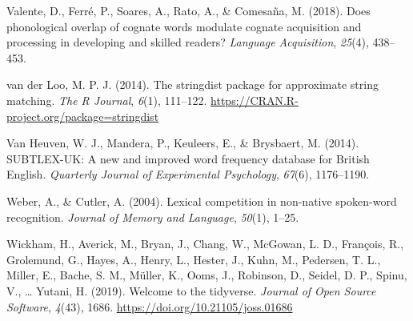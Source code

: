 \documentclass[
]{article}
\newlength{\cslhangindent}
\newenvironment{CSLReferences}[2] %
 {\begin{list}{}{%
  \setlength{\itemindent}{0pt}
  \setlength{\leftmargin}{0pt}
  \setlength{\parsep}{0pt}
  \ifodd #1
   \setlength{\leftmargin}{\cslhangindent}
   \setlength{\itemindent}{-1\cslhangindent}
  \fi
  \setlength{\itemsep}{#2\baselineskip}}}
 {\end{list}}
\begin{document}
\begin{CSLReferences}{1}{0}
Valente, D., Ferré, P., Soares, A., Rato, A., \& Comesaña, M. (2018).
Does phonological overlap of cognate words modulate cognate acquisition
and processing in developing and skilled readers? \emph{Language
Acquisition}, \emph{25}(4), 438--453.

van der Loo, M. P. J. (2014). The stringdist package for approximate
string matching. \emph{The R Journal}, \emph{6}(1), 111--122.
\url{https://CRAN.R-project.org/package=stringdist}

Van Heuven, W. J., Mandera, P., Keuleers, E., \& Brysbaert, M. (2014).
{SUBTLEX-UK}: {A} new and improved word frequency database for {British
English}. \emph{Quarterly Journal of Experimental Psychology},
\emph{67}(6), 1176--1190.

Weber, A., \& Cutler, A. (2004). Lexical competition in non-native
spoken-word recognition. \emph{Journal of Memory and Language},
\emph{50}(1), 1--25.

Wickham, H., Averick, M., Bryan, J., Chang, W., McGowan, L. D.,
François, R., Grolemund, G., Hayes, A., Henry, L., Hester, J., Kuhn, M.,
Pedersen, T. L., Miller, E., Bache, S. M., Müller, K., Ooms, J.,
Robinson, D., Seidel, D. P., Spinu, V., \ldots{} Yutani, H. (2019).
Welcome to the tidyverse. \emph{Journal of Open Source Software},
\emph{4}(43), 1686. \url{https://doi.org/10.21105/joss.01686}

\end{CSLReferences}
\end{document}

